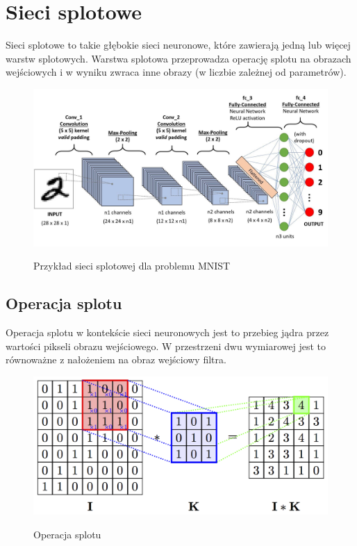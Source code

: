 \documentclass{article}
\begin{document}
\section{Sieci splotowe}
Sieci splotowe to takie głębokie sieci neuronowe, które zawierają jedną lub więcej warstw splotowych.
Warstwa splotowa przeprowadza operację splotu na obrazach wejściowych i w wyniku zwraca inne obrazy (w liczbie zależnej od parametrów).
\begin{figure}[H]
    \centering
    \includegraphics[width=\linewidth]{images/cnn.jpeg}
    \caption{Przykład sieci splotowej dla problemu MNIST}
    \cite{cnn}
\end{figure}
\subsection{Operacja splotu}
Operacja splotu w kontekście sieci neuronowych jest to przebieg jądra przez wartości pikseli obrazu wejściowego.
W przestrzeni dwu wymiarowej jest to równoważne z nałożeniem na obraz wejściowy filtra.
\begin{figure}[H]
    \centering
    \includegraphics[width=\linewidth]{images/convolution.png}
    \caption{Operacja splotu}
    \cite{convolution}
\end{figure}
\end{document}
